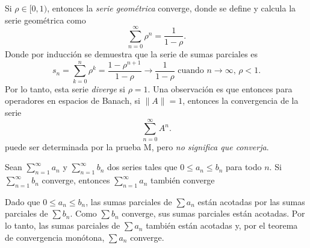 \documentclass[main.tex]{subfiles}
\begin{document}
\eje Si \(\rho\in[0,1)\), entonces la \emph{serie geométrica} converge, donde se define y calcula la serie geométrica como
\[
\sum_{n=0}^{\infty}\rho^n=\frac{1}{1-\rho}.
\]
Donde por inducción se demuestra que la serie de sumas parciales es
\[
s_n=\sum_{k=0}^{n}\rho^k=\frac{1-\rho^{n+1}}{1-\rho}\to\frac{1}{1-\rho}\text{ cuando }n\to\infty,\,\rho<1.
\]
Por lo tanto, esta serie \emph{diverge} si \(\rho=1\). Una observación es que entonces para operadores en espacios de Banach, si \(\|A\|=1\), entonces la convergencia de la serie
\[
\sum_{n=0}^{\infty}A^n.
\]
 puede ser determinada por la prueba M, pero \emph{no significa que converja}.


\begin{prop}
Sean \(\sum_{n=1}^\infty a_n\) y \(\sum_{n=1}^\infty b_n\) dos series tales que \(0 \leq a_n \leq b_n\) para todo \(n\). Si \(\sum_{n=1}^\infty b_n\) converge, entonces \(\sum_{n=1}^\infty a_n\) también converge
\end{prop}
\dem Dado que \(0 \leq a_n \leq b_n\), las sumas parciales de \(\sum a_n\) están acotadas por las sumas parciales de \(\sum b_n\). Como \(\sum b_n\) converge, sus sumas parciales están acotadas. Por lo tanto, las sumas parciales de \(\sum a_n\) también están acotadas y, por el teorema de convergencia monótona, \(\sum a_n\) converge.
\end{document}
